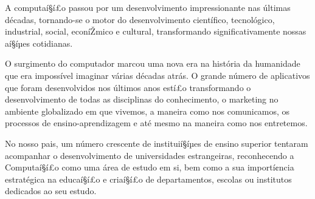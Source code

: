 A computaí§í£o passou por um desenvolvimento impressionante nas últimas décadas, 
tornando-se o motor do desenvolvimento cientí­fico, tecnológico, 
industrial, social, econíŽmico e cultural, transformando significativamente 
nossas aí§íµes cotidianas.

O surgimento do computador marcou uma nova era na história da humanidade 
que era impossí­vel imaginar várias décadas atrás. O grande número de aplicativos 
que foram desenvolvidos nos últimos anos estí£o transformando o desenvolvimento 
de todas as disciplinas do conhecimento, o marketing no ambiente globalizado 
em que vivemos, a maneira como nos comunicamos, os processos de 
ensino-aprendizagem e até mesmo na maneira como nos entretemos.


No nosso pais, um número crescente de instituií§íµes de ensino superior
tentaram acompanhar o desenvolvimento de universidades estrangeiras, reconhecendo a Computaí§í£o como uma área de estudo
em si, bem como a sua importí¢ncia estratégica na educaí§í£o e criaí§í£o de
departamentos, escolas ou institutos dedicados ao seu estudo. 